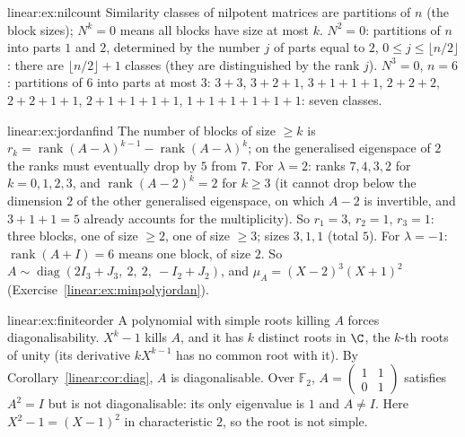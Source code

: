 \begin{solution}{linear:ex:nilcount}
\idea Similarity classes of nilpotent matrices are partitions of $n$ (the block sizes); $N^k=0$ means all blocks have size
at most $k$.
\writeup $N^2=0$: partitions of $n$ into parts $1$ and $2$, determined by the number $j$ of parts equal to $2$,
$0\le j\le\lfloor n/2\rfloor$: there are $\lfloor n/2\rfloor+1$ classes (they are distinguished by the rank $j$). $N^3=0$, $n=6$:
partitions of $6$ into parts at most $3$: $3{+}3$, $3{+}2{+}1$, $3{+}1{+}1{+}1$, $2{+}2{+}2$, $2{+}2{+}1{+}1$,
$2{+}1{+}1{+}1{+}1$, $1{+}1{+}1{+}1{+}1{+}1$: seven classes.
\end{solution}

\begin{solution}{linear:ex:jordanfind}
\idea The number of blocks of size $\ge k$ is $r_k=\operatorname{rank}(A-\lambda)^{k-1}-\operatorname{rank}(A-\lambda)^k$; on the
generalised eigenspace of $2$ the ranks must eventually drop by $5$ from $7$.
\writeup For $\lambda=2$: ranks $7,4,3,2$ for $k=0,1,2,3$, and $\operatorname{rank}(A-2)^k=2$ for $k\ge3$ (it cannot drop
below the dimension $2$ of the other generalised eigenspace, on which $A-2$ is invertible, and $3+1+1=5$ already accounts
for the multiplicity). So $r_1=3$, $r_2=1$, $r_3=1$: three blocks, one of size $\ge2$, one of size $\ge3$; sizes $3,1,1$
(total $5$). For $\lambda=-1$: $\operatorname{rank}(A+I)=6$ means one block, of size $2$. So
$A\sim\operatorname{diag}(2I_3+J_3,\ 2,\ 2,\ -I_2+J_2)$, and $\mu_A=(X-2)^3(X+1)^2$ (Exercise~\ref{linear:ex:minpolyjordan}).
\end{solution}

\begin{solution}{linear:ex:finiteorder}
\idea A polynomial with simple roots killing $A$ forces diagonalisability.
\writeup $X^k-1$ kills $A$, and it has $k$ distinct roots in $\C$, the $k$-th roots of unity (its derivative $kX^{k-1}$ has
no common root with it). By Corollary~\ref{linear:cor:diag}, $A$ is diagonalisable. Over $\mathbb F_2$,
$A=\begin{pmatrix}1&1\\0&1\end{pmatrix}$ satisfies $A^2=I$ but is not diagonalisable: its only eigenvalue is $1$ and $A\ne I$. Here
$X^2-1=(X-1)^2$ in characteristic $2$, so the root is not simple.
\end{solution}

